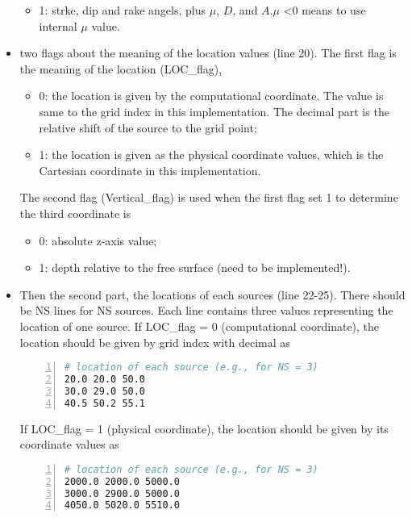 \begin{itemize}
\begin{itemize}
            \item 1: strke, dip and rake angels, plus $\mu$, $D$, and $A$.$\mu$ <0 means to use internal $\mu$ value.
        \end{itemize}
    \item two flags about the meaning of the location values (line 20).
        The first flag is the meaning of the location (LOC\_flag), 
        \begin{itemize}
            \item 0: the location is given by the computational coordinate. The value is same to the grid index in this implementation. 
                The decimal part is the relative shift of the source to the grid point;
            \item 1: the location is given as the physical coordinate values, which is the Cartesian coordinate in this implementation.
        \end{itemize}
        The second flag (Vertical\_flag) is used when the first flag set 1 to determine the third coordinate is
        \begin{itemize}
            \item 0: absolute z-axis value;
            \item 1: depth relative to the free surface (need to be implemented!).
        \end{itemize}
    \item Then the second part, the locations of each sources (line 22-25). There should be NS lines for NS sources.
        Each line contains three values representing the location of one source.
        If LOC\_flag = 0 (computational coordinate), the location should be given by grid index with decimal as
\begin{lstlisting}[language=bash, caption=Source location by computational coordinate,
   numbers=left, numbersep=5pt,numberstyle=\tiny\color{codegray}, commentstyle=\color{codegreen},
   frame=tb]
# location of each source (e.g., for NS = 3)
20.0 20.0 50.0
30.0 29.0 50.0
40.5 50.2 55.1
\end{lstlisting}
        If LOC\_flag = 1 (physical coordinate), the location should be given by its coordinate values as
\begin{lstlisting}[language=bash, caption=Source location by physical coordinate,
   numbers=left, numbersep=5pt,numberstyle=\tiny\color{codegray}, commentstyle=\color{codegreen},
   frame=tb]
# location of each source (e.g., for NS = 3)
2000.0 2000.0 5000.0
3000.0 2900.0 5000.0
4050.0 5020.0 5510.0
\end{lstlisting}

\end{itemize}
